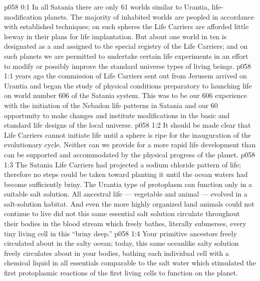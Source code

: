 \author{Life Carrier}
\vs p058 0:1 In all Satania there are only 61 worlds similar to Urantia, life\hyp{}modification planets. The majority of inhabited worlds are peopled in accordance with established techniques; on such spheres the Life Carriers are afforded little leeway in their plans for life implantation. But about one world in ten is designated as a  and assigned to the special registry of the Life Carriers; and on such planets we are permitted to undertake certain life experiments in an effort to modify or possibly improve the standard universe types of living beings.
\vs p058 1:1  years ago the commission of Life Carriers sent out from Jerusem arrived on Urantia and began the study of physical conditions preparatory to launching life on world number 606 of the Satania system. This was to be our 606 experience with the initiation of the Nebadon life patterns in Satania and our 60 opportunity to make changes and institute modifications in the basic and standard life designs of the local universe.
\vs p058 1:2 \pc It should be made clear that Life Carriers cannot initiate life until a sphere is ripe for the inauguration of the evolutionary cycle. Neither can we provide for a more rapid life development than can be supported and accommodated by the physical progress of the planet.
\vs p058 1:3 The Satania Life Carriers had projected a sodium chloride pattern of life; therefore no steps could be taken toward planting it until the ocean waters had become sufficiently briny. The Urantia type of protoplasm can function only in a suitable salt solution. All ancestral life --- vegetable and animal --- evolved in a salt\hyp{}solution habitat. And even the more highly organized land animals could not continue to live did not this same essential salt solution circulate throughout their bodies in the blood stream which freely bathes, literally submerses, every tiny living cell in this “briny deep.”
\vs p058 1:4 Your primitive ancestors freely circulated about in the salty ocean; today, this same oceanlike salty solution freely circulates about in your bodies, bathing each individual cell with a chemical liquid in all essentials comparable to the salt water which stimulated the first protoplasmic reactions of the first living cells to function on the planet.

